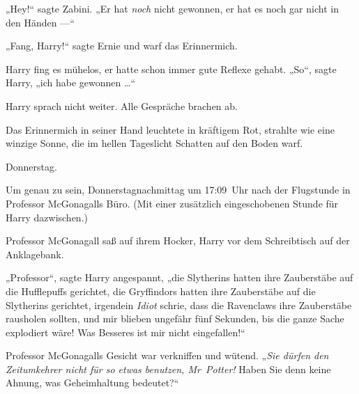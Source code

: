 „Hey!“ sagte Zabini.
„Er hat \emph{noch} nicht gewonnen, er hat es noch gar nicht in den Händen —“

„Fang, Harry!“ sagte Ernie und warf das Erinnermich.

Harry fing es mühelos, er hatte schon immer gute Reflexe gehabt.
„So“, sagte Harry, „ich habe gewonnen …“

Harry sprach nicht weiter. Alle Gespräche brachen ab.

Das Erinnermich in seiner Hand leuchtete in kräftigem Rot, strahlte wie eine winzige Sonne, die im hellen Tageslicht Schatten auf den Boden warf.

\later

Donnerstag.

Um genau zu sein, Donnerstagnachmittag um 17:09~Uhr nach der Flugstunde in Professor McGonagalls Büro. (Mit einer zusätzlich eingeschobenen Stunde für Harry dazwischen.)

Professor McGonagall saß auf ihrem Hocker, Harry vor dem Schreibtisch auf der Anklagebank.

„Professor“, sagte Harry angespannt, „die Slytherins hatten ihre Zauberstäbe auf die Hufflepuffs gerichtet, die Gryffindors hatten ihre Zauberstäbe auf die Slytherins gerichtet, irgendein \emph{Idiot} schrie, dass die Ravenclaws ihre Zauberstäbe rausholen sollten, und mir blieben ungefähr fünf Sekunden, bis die ganze Sache explodiert wäre! Was Besseres ist mir nicht eingefallen!“

Professor McGonagalls Gesicht war verkniffen und wütend.
„\emph{Sie dürfen den Zeitumkehrer nicht für so etwas benutzen, Mr~Potter!} Haben Sie denn keine Ahnung, was Geheimhaltung bedeutet?“

